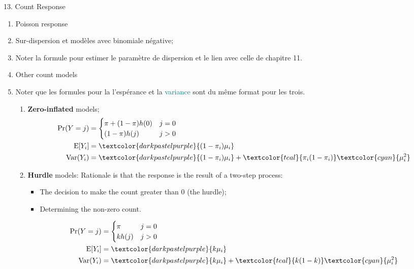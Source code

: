 \documentclass[12pt, titlepage, french]{report}
\begin{document}
\begin{CHPT_SUMM}[label = {GLM-COUNT}]{13. Count Response}
\begin{enumerate}
	\item	Poisson response
	\item	Sur-dispersion et modèles avec binomiale négative;
	\item[]	Noter la formule pour estimer le paramètre de dispersion et le lien avec celle de chapitre 11.
	\item	Other count models
	\item[]	Noter que les formules pour la \textcolor{darkpastelpurple}{l'espérance} et la \textcolor{teal}{variance} sont du même format pour les trois.
	\begin{enumerate}
		\item	\textbf{Zero-inflated} models;
		\begin{align*}
			\Pr(Y = j) &= 
			\begin{cases}
				\pi	+ (1 - \pi) h(0)	&	j = 0	\\
				(1 - \pi) h(j)		&	j > 0	\\
			\end{cases}	\\
			\text{E}[Y_{i}]		&=	\textcolor{darkpastelpurple}{(1 - \pi_{i}) \mu_{i}}	\\
			\text{Var}(Y_{i})	&=	\textcolor{darkpastelpurple}{(1 - \pi_{i}) \mu_{i}} + \textcolor{teal}{\pi_{i} (1 - \pi_{i})} \textcolor{cyan}{\mu_{i}^{2}}
		\end{align*}
		\item	\textbf{Hurdle} models: Rationale is that the response is the result of a two-step process:
		\begin{itemize}
			\item	The decision to make the count greater than 0 (the hurdle);
			\item	Determining the non-zero count.
		\end{itemize}
		\begin{align*}
			\Pr(Y = j) &= 
			\begin{cases}
				\pi	&	j = 0	\\
				k h(j)	&	j > 0	\\
			\end{cases}	\\
			\text{E}[Y_{i}]		&=	\textcolor{darkpastelpurple}{k \mu_{i}}	\\
			\text{Var}(Y_{i})	&=	\textcolor{darkpastelpurple}{k \mu_{i}} + \textcolor{teal}{k (1 - k)} \textcolor{cyan}{\mu_{i}^{2}} \\

\end{align*}
\end{enumerate}
\end{enumerate}
\end{CHPT_SUMM}
\end{document}
